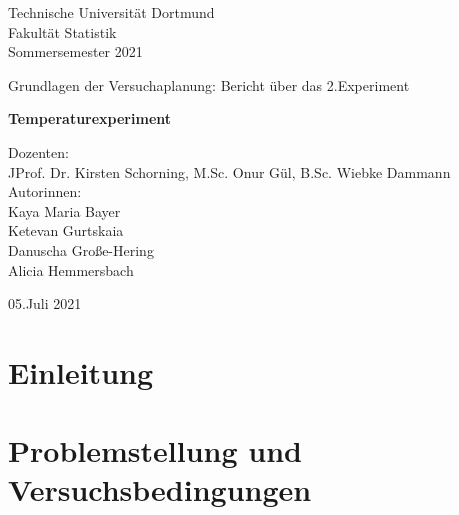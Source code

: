 \documentclass[ ngerman, fontsize= 12pt, paper=a4, headings=big, titlepage=true]{article}
\begin{document}
	
	
\begin{center}
	\Large
	Technische Universität Dortmund\\
	Fakultät Statistik\\
	Sommersemester 2021\\
	
	\vspace{4em}
	
	Grundlagen der Versuchaplanung: Bericht über das 2.Experiment
	
	\Huge
	\textbf{Temperaturexperiment}
	
	\Large
	\vspace{5em}
	Dozenten:\\
	JProf. Dr. Kirsten Schorning, M.Sc. Onur Gül, B.Sc. Wiebke Dammann\\
	
	
	\vspace{3em}
	Autorinnen: \\
	Kaya Maria Bayer\\
	Ketevan Gurtskaia\\
    Danuscha Große-Hering\\	
	Alicia Hemmersbach\\

	
	
	\vspace{4em}
	
	05.Juli 2021
	
\end{center}

\newpage	

\tableofcontents
\newpage

\section{Einleitung}
\section{Problemstellung und Versuchsbedingungen}
\end{document}
